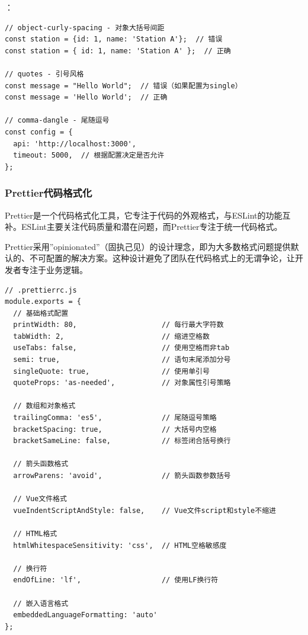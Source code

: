 ：

\begin{lstlisting}[style=javascript]
// object-curly-spacing - 对象大括号间距
const station = {id: 1, name: 'Station A'};  // 错误
const station = { id: 1, name: 'Station A' };  // 正确

// quotes - 引号风格
const message = "Hello World";  // 错误（如果配置为single）
const message = 'Hello World';  // 正确

// comma-dangle - 尾随逗号
const config = {
  api: 'http://localhost:3000',
  timeout: 5000,  // 根据配置决定是否允许
};
\end{lstlisting}

\hypertarget{prettierux4ee3ux7801ux683cux5f0fux5316}{%
\subsubsection{Prettier代码格式化}\label{prettierux4ee3ux7801ux683cux5f0fux5316}}

Prettier是一个代码格式化工具，它专注于代码的外观格式，与ESLint的功能互补。ESLint主要关注代码质量和潜在问题，而Prettier专注于统一代码格式。


Prettier采用''opinionated''（固执己见）的设计理念，即为大多数格式问题提供默认的、不可配置的解决方案。这种设计避免了团队在代码格式上的无谓争论，让开发者专注于业务逻辑。


\begin{lstlisting}[style=javascript]
// .prettierrc.js
module.exports = {
  // 基础格式配置
  printWidth: 80,                    // 每行最大字符数
  tabWidth: 2,                       // 缩进空格数
  useTabs: false,                    // 使用空格而非tab
  semi: true,                        // 语句末尾添加分号
  singleQuote: true,                 // 使用单引号
  quoteProps: 'as-needed',           // 对象属性引号策略
  
  // 数组和对象格式
  trailingComma: 'es5',              // 尾随逗号策略
  bracketSpacing: true,              // 大括号内空格
  bracketSameLine: false,            // 标签闭合括号换行
  
  // 箭头函数格式
  arrowParens: 'avoid',              // 箭头函数参数括号
  
  // Vue文件格式
  vueIndentScriptAndStyle: false,    // Vue文件script和style不缩进
  
  // HTML格式
  htmlWhitespaceSensitivity: 'css',  // HTML空格敏感度
  
  // 换行符
  endOfLine: 'lf',                   // 使用LF换行符
  
  // 嵌入语言格式
  embeddedLanguageFormatting: 'auto'
};
\end{lstlisting}


